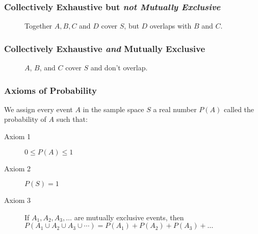 \begin{frame}
\frametitle{Collectively Exhaustive but \emph{not Mutually Exclusive}}
\begin{figure}
\centering
{}
\caption{Together $A, B, C$ and $D$ cover $S$, but $D$ overlaps with $B$ and $C$.}
\end{figure}
\end{frame}

\begin{frame}
\frametitle{Collectively Exhaustive \emph{and} Mutually Exclusive}
\begin{figure}
\centering
{}
\caption{$A$, $B$, and $C$ cover $S$ and don't overlap.}
\end{figure}
\end{frame}


\begin{frame}
\frametitle{Axioms of Probability}
We assign every event $A$ in the sample space $S$ a real number $P(A)$ called the \alert{probability of $A$} such that: 
\vspace{1em}
\begin{description}
	\item[Axiom 1] $0 \leq P(A) \leq 1$
	\item[Axiom 2] $P(S)=1$
	\item[Axiom 3] If $A_1, A_2, A_3, \hdots$ are mutually exclusive events, then $P(A_1\cup A_2 \cup A_3 \cup \cdots) = P(A_1) + P(A_2) + P(A_3) + \hdots$
\end{description}

\end{frame}
